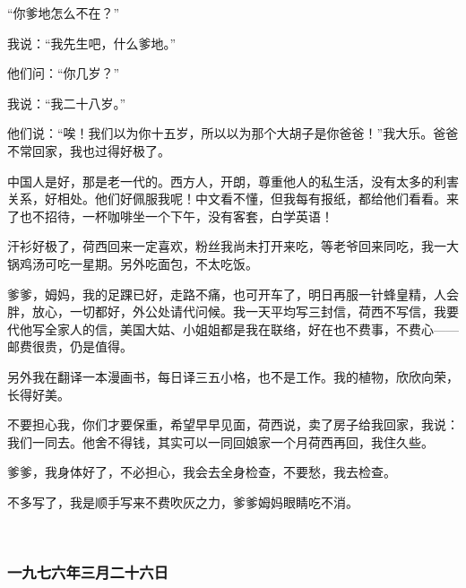 \par “你爹地怎么不在？”
\par 我说：“我先生吧，什么爹地。”
\par 他们问：“你几岁？”
\par 我说：“我二十八岁。”
\par 他们说：“唉！我们以为你十五岁，所以以为那个大胡子是你爸爸！”我大乐。爸爸不常回家，我也过得好极了。
\par 中国人是好，那是老一代的。西方人，开朗，尊重他人的私生活，没有太多的利害关系，好相处。他们好佩服我呢！中文看不懂，但我每有报纸，都给他们看看。来了也不招待，一杯咖啡坐一个下午，没有客套，白学英语！
\par 汗衫好极了，荷西回来一定喜欢，粉丝我尚未打开来吃，等老爷回来同吃，我一大锅鸡汤可吃一星期。另外吃面包，不太吃饭。
\par 爹爹，姆妈，我的足踝已好，走路不痛，也可开车了，明日再服一针蜂皇精，人会胖，放心，一切都好，外公处请代问候。我一天平均写三封信，荷西不写信，我要代他写全家人的信，美国大姑、小姐姐都是我在联络，好在也不费事，不费心——邮费很贵，仍是值得。
\par 另外我在翻译一本漫画书，每日译三五小格，也不是工作。我的植物，欣欣向荣，长得好美。
\par 不要担心我，你们才要保重，希望早早见面，荷西说，卖了房子给我回家，我说：我们一同去。他舍不得钱，其实可以一同回娘家一个月荷西再回，我住久些。
\par 爹爹，我身体好了，不必担心，我会去全身检查，不要愁，我去检查。
\par 不多写了，我是顺手写来不费吹灰之力，爹爹姆妈眼睛吃不消。
\par  
\par {}



\subsubsection{一九七六年三月二十六日}


